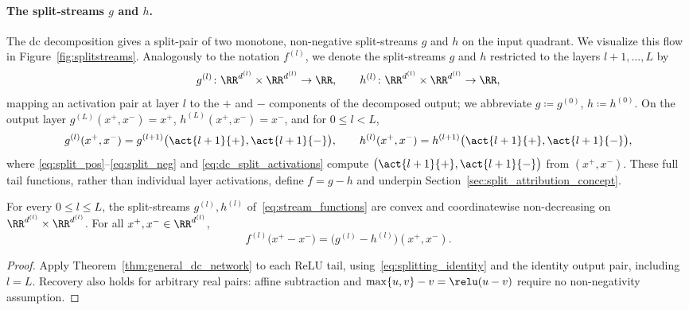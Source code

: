 \paragraph{The split-streams $g$ and $h$.}
The \ac{dc} decomposition gives a split-pair of two monotone, non-negative split-streams $g$ and $h$ on the input quadrant. We visualize this flow in Figure~\ref{fig:splitstreams}. Analogously to the notation $f^{(l)}$, we denote the split-streams $g$ and $h$ restricted to the layers $l+1,\dots,L$ by
\begin{equation}
	g^{(l)} \colon \RR^{d^{(l)}} \times \RR^{d^{(l)}} \to \RR,
	\qquad
	h^{(l)} \colon \RR^{d^{(l)}} \times \RR^{d^{(l)}} \to \RR,
	\label{eq:stream_functions}
\end{equation}
mapping an activation pair at layer $l$ to the $+$ and $-$ components of the decomposed output; we abbreviate $g \coloneqq g^{(0)}$, $h \coloneqq h^{(0)}$. On the output layer $g^{(L)}(x^+, x^-) = x^+$, $h^{(L)}(x^+, x^-) = x^-$, and for $0 \le l < L$,
\begin{equation}
	g^{(l)}(x^+, x^-) = g^{(l+1)}\bigl(\act{l+1}{+}, \act{l+1}{-}\bigr),
	\qquad
	h^{(l)}(x^+, x^-) = h^{(l+1)}\bigl(\act{l+1}{+}, \act{l+1}{-}\bigr),
	\label{eq:stream_recursion}
\end{equation}
where \eqref{eq:split_pos}--\eqref{eq:split_neg} and \eqref{eq:dc_split_activations} compute $\bigl(\act{l+1}{+}, \act{l+1}{-}\bigr)$ from $(x^+,x^-)$. These full tail functions, rather than individual layer activations, define $f=g-h$ and underpin Section~\ref{sec:split_attribution_concept}.

\begin{theoremenv}\label{thm:split_correct}
For every $0\le l\le L$, the split-streams $g^{(l)},h^{(l)}$ of~\eqref{eq:stream_functions} are convex and coordinatewise non-decreasing on $\RR^{d^{(l)}}\times\RR^{d^{(l)}}$. For all $x^+,x^-\in\RR^{d^{(l)}}$,
\begin{equation}
	f^{(l)}\bigl(x^+-x^-\bigr)=\bigl(g^{(l)}-h^{(l)}\bigr)(x^+,x^-).
	\label{eq:split_correctness}
\end{equation}
\end{theoremenv}
\begin{proof}
Apply Theorem~\ref{thm:general_dc_network} to each ReLU tail, using~\eqref{eq:splitting_identity} and the identity output pair, including $l=L$. Recovery also holds for arbitrary real pairs: affine subtraction and $\max\{u,v\}-v=\relu(u-v)$ require no non-negativity assumption.
\end{proof}

